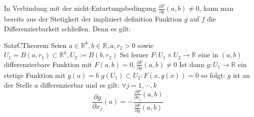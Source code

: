 In Verbindung mit der nicht-Entartungsbedingung $ \frac{\partial F}{\partial g} (a,b) \neq 0 $, kann man bereits aus der Stetigkeit
der impliziert definition Funktion $ g $ auf $ f $ die Differenzierbarkeit schließen. Denn es gilt: 
\begin{ibox}[45]{Satz}{CTheorem}
    Seien $ a \in \mathbb{R}^{k}, b \in \mathbb{R}, a, r_{2} > 0 $ sowie $ U_1 = B (a,r_1) \subset \mathbb{R}^{k}, U_2 := B(b,r_2) $
		Sei ferner $ F: U_1 \times U_2 \to \mathbb{R}  $ eine in $ (a,b) $ differenzierbare Funktion mit $ F (a,b) = 0, 
		\frac{\partial F}{\partial y} (a,b) \neq 0$ Ist dann $ g: U_1 \to \mathbb{R}  $ ein stetige Funktion mit $ g (a) = b $ 
		$ g \left(U_1\right) \subset U_2:  F (x,g (x)) = 0 $ so folgt: $ g $ ist an der Stelle $ a $ differenzierbar und es gilt: 
		$ \forall j = 1 , \cdots,  k $ 
		$$ \frac{\partial g}{\partial x_j} \left(a\right) = - \frac{ \frac{\partial F}{\partial x_j} (a,b)}{ \frac{\partial F}{\partial y} (a,b)}   $$
		
\end{ibox}
 

%
